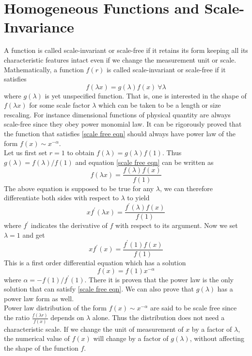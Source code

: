 \section{Homogeneous Functions and Scale-Invariance}
	A function is called scale-invariant or scale-free if it retains its form keeping all its characteristic features intact even if we change the measurement unit or scale. Mathematically, a function $f(r)$ is called scale-invariant or scale-free if it satisfies
	\begin{equation}
		f(\lambda x) = g(\lambda) f(x) \ \forall \lambda
		\label{scale free eqn}
	\end{equation}
	where $g(\lambda)$ is yet unspecified function. That is, one is interested in the shape of $f(\lambda x)$ for some scale factor $\lambda$ which can be taken to be a length or size rescaling. For instance dimensional functions of physical quantity are always scale-free since they obey power monomial law. It can be rigorously proved that the function that satisfies \ref{scale free eqn} should always have power law of the form $f(x) \sim x^{-\alpha}$.\\
	Let us first set $r=1$ to obtain $f(\lambda) = g(\lambda)f(1)$. Thus $g(\lambda)=f(\lambda)/f(1)$ and equation \ref{scale free eqn} can be written as
	\begin{equation}
		f(\lambda x) = \frac{f(\lambda) f(x)}{f(1)}
	\end{equation}
	The above equation is supposed to be true for any $\lambda$, we can therefore differentiate both sides with respect to $\lambda$ to yield
	\begin{equation}
		x f^\prime(\lambda x) = \frac{f^\prime(\lambda) f(x)}{f(1)}
	\end{equation}
	where $f^\prime$ indicates the derivative of $f$ with respect to its argument. Now we set $\lambda=1$ and get
	\begin{equation}
		x f^\prime(x) = \frac{f^\prime(1) f(x)}{f(1)}
	\end{equation}
	This is a first order differential equation which has a solution
	\begin{equation}
		f(x) = f(1) x^{-\alpha}
	\end{equation}
	where $\alpha = - f(1) / f^\prime (1)$. There it is proven that the power law is the only solution that can satisfy \ref{scale free eqn}. We can also prove that $g(\lambda)$ has a power law form as well.\\
	Power law distribution of the form $f(x) \sim x^{-\alpha}$ are said to be scale free since the ratio $\frac{f(\lambda r)}{f(x)}$ depends on $\lambda$ alone. Thus the distribution does not need a characteristic scale. If we change the unit of measurement of $x$ by a factor of $\lambda$, the numerical value of $f(x)$ will change by a factor of $g(\lambda)$, without affecting the shape of the function $f$. 
